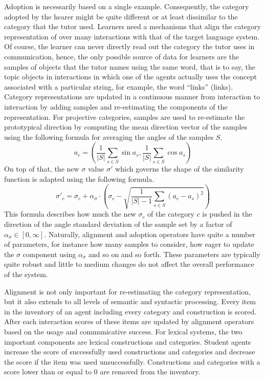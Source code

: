 Adoption is necessarily based on a single example. Consequently, the category
adopted by the hearer might be quite different or at least dissimilar to the category
that the tutor used. Learners need a mechanisms that align the category 
representation of over many interactions with that of the target language system. 
Of course, the learner can never directly read out 
the category the tutor uses in communication, hence, the only possible source of 
data for learners are the samples of objects that the tutor names using the same word, 
that is to say, the topic objects in interactions in which one of the agents actually uses 
the concept associated with a particular string, for example, the word ``links'' (links). Category representations are updated in a continuous manner 
from interaction to interaction by adding samples and re-estimating the components of 
the representation. For projective categories, samples are used to 
re-estimate the prototypical direction by computing the mean direction vector of 
the samples using the following formula for averaging the angles of the samples $S$.
\begin{equation}
a_c = 
\left(\frac{1}{|S|}\sum_{s\in S}\sin a_s,\frac{1}{|S|}\sum_{s\in S}\cos a_s\right)
\label{e:update-a}
\end{equation} 
On top of that, the new $\sigma$ value $\sigma'$ 
which governs the shape of the similarity function is adapted using the following formula.
\begin{equation}
\sigma'_c = \sigma_c + \alpha_\sigma \cdot \left(\sigma_c - \sqrt{\frac{1}{|S|-1}\sum_{s\in S}(a_c - a_s)^2}\right)
\label{e:update-sigma-a}
\end{equation} 
This formula describes how much the new $\sigma_c$ of the category $c$ 
is pushed in the direction of the angle standard deviation of the sample set 
by a factor of $\alpha_\sigma \in [0,\infty]$. Naturally, alignment and
adoption operators have quite a number of parameters, for instance
how many samples to consider, how eager to update the $\sigma$ component using
$\alpha_\sigma$ and so on and so forth. These parameters are typically quite robust and little to
medium changes do not affect the overall performance of the system.

Alignment is not only important for re-estimating the category representation,
but it also extends to all levels of semantic and syntactic processing. Every item 
in the inventory of an agent including every category and construction is scored. 
After each interaction scores of these items are updated by alignment operators 
based on the usage and communicative success. 
For lexical systems, the two important components are
lexical constructions and categories. Student agents increase the score of successfully
used constructions and categories and decrease the score 
if the item was used unsuccessfully. Constructions and categories with 
a score lower than or equal to $0$ are removed from the inventory. 

